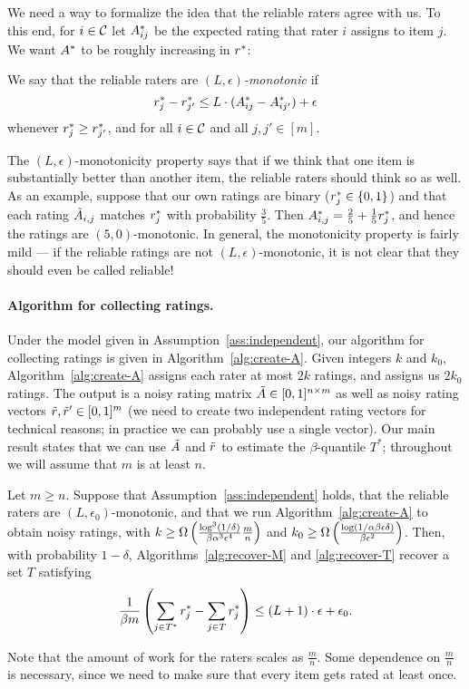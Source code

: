 We need a way to formalize the idea that the reliable raters 
agree with us. To this end, for $i \in \mathcal{C}$ let $A^*_{ij}$ be
the expected rating that rater $i$ assigns to item $j$.
We want $A^*$ to be roughly increasing in $r^*$:
\begin{definition}
\label{def:lipschitz}
We say that the reliable raters are \emph{$(L,\epsilon)$-monotonic} if 
\begin{equation}
\label{eq:lipschitz}
r^*_j - r^*_{j'} \leq L \cdot (A^*_{ij} - A^*_{ij'}) + \epsilon
\end{equation}
whenever $r^*_j \geq r^*_{j'}$, and
for all $i \in \mathcal{C}$ and all $j,j' \in [m]$.
\end{definition}
The $(L,\epsilon)$-monotonicity property says that if we think that one item is 
substantially better than another item, the reliable raters should think 
so as well. As an example, suppose that our own ratings are binary 
($r^*_j \in \{0,1\}$) and that each rating $\tilde{A}_{i,j}$ matches $r^*_j$ 
with probability $\frac{3}{5}$. Then 
$A^*_{i,j} = \frac{2}{5} + \frac{1}{5}r^*_j$, 
and hence the ratings are $(5,0)$-monotonic. 
In general, the monotonicity property is fairly mild --- if the reliable ratings 
are not $(L,\epsilon)$-monotonic, it is not clear that they should 
even be called reliable!

\paragraph{Algorithm for collecting ratings.}
Under the model given in Assumption~\ref{ass:independent}, 
our algorithm for collecting ratings is given in 
Algorithm~\ref{alg:create-A}. Given integers $k$ and $k_0$, 
Algorithm~\ref{alg:create-A} assigns each rater at most $2k$ 
ratings, and assigns us $2k_0$ ratings. The output is a 
noisy rating matrix $\tilde{A} \in [0,1]^{n \times m}$ as well 
as noisy rating vectors $\tilde{r}, \tilde{r}' \in [0,1]^m$ (we need 
to create two independent rating vectors for technical reasons; 
in practice we can probably use a single vector).
Our main result states that we can use $\tilde{A}$ and $\tilde{r}$ to 
estimate the $\beta$-quantile $T^*$; throughout we will assume 
that $m$ is at least $n$.
\begin{theorem}
\label{thm:main}
Let $m \geq n$. 
Suppose that Assumption~\ref{ass:independent} holds, that 
the reliable raters are $(L,\epsilon_0)$-monotonic, and 
that we run Algorithm~\ref{alg:create-A} to obtain noisy ratings, 
with $k \geq \Omega\left( \frac{\log^3(1/\delta)}{\beta\alpha^3\epsilon^4}\frac{m}{n} \right)$ and
$k_0 \geq \Omega\left( \frac{\log(1/\alpha\beta\epsilon\delta)}{\beta\epsilon^2} \right)$.
Then, with probability $1-\delta$, 
Algorithms~\ref{alg:recover-M} and \ref{alg:recover-T} recover a set $T$ satisfying 
\[ \frac{1}{\beta m} \left( \sum_{j \in T^*} r^*_j - \sum_{j \in T} r^*_j \right) 
\leq (L+1) \cdot \epsilon + \epsilon_0. \]
\end{theorem}
Note that the amount of work for the raters scales as $\frac{m}{n}$. Some dependence 
on $\frac{m}{n}$ is necessary, since we need to make sure that every item gets rated at least once.

